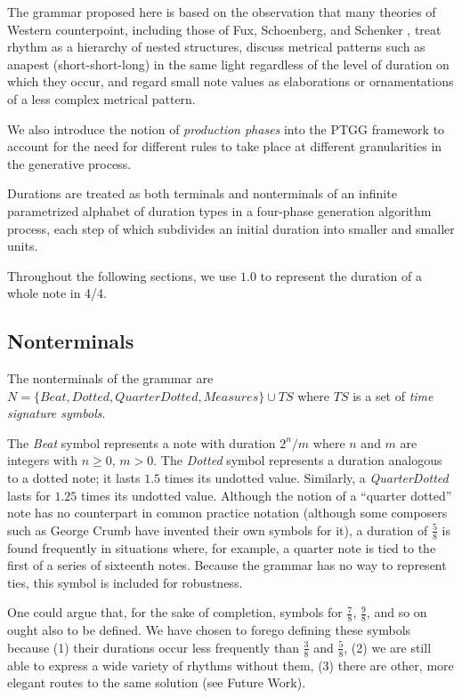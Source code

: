 \documentclass{article}
\begin{document}
The grammar proposed here is based on the observation that many theories of Western counterpoint, including those of Fux, Schoenberg, and Schenker \cite{fux_et_al, schoenberg}, treat rhythm as a hierarchy of nested structures, discuss metrical patterns such as anapest (short-short-long) in the same light regardless of the level of duration on which they occur, and regard small note values as elaborations or ornamentations of a less complex metrical pattern.

We also introduce the notion of \emph{production phases} into the PTGG framework to account for the need for different rules to take place at different granularities in the generative process.

Durations are treated as both terminals and nonterminals of an infinite parametrized alphabet of duration types in a four-phase generation algorithm process, each step of which subdivides an initial duration into smaller and smaller units.

Throughout the following sections, we use $1.0$ to represent the duration of a whole note in 4/4.

\subsection{Nonterminals}

The nonterminals of the grammar are $N=\{Beat,\allowbreak Dotted,\allowbreak QuarterDotted,\allowbreak Measures \} \cup TS$ where $TS$ is a set of \emph{time signature symbols}. 


The \emph{Beat} symbol represents a note with duration $2^n/m$ where $n$ and $m$ are integers with $n \geq 0$, $m > 0$. The \emph{Dotted} symbol represents a duration analogous to a dotted note; it lasts $1.5$ times its undotted value. Similarly, a \emph{QuarterDotted} lasts for $1.25$ times its undotted value. Although the notion of a ``quarter dotted'' note has no counterpart in common practice notation (although some composers such as George Crumb have invented their own symbols for it), a duration of $\frac{5}{8}$ is found frequently in situations where, for example, a quarter note is tied to the first of a series of sixteenth notes. Because the grammar has no way to represent ties, this symbol is included for robustness.

One could argue that, for the sake of completion, symbols for $\frac{7}{8}$, $\frac{9}{8}$, and so on ought also to be defined. We have chosen to forego defining these symbols because (1) their durations occur less frequently than $\frac{3}{8}$ and $\frac{5}{8}$, (2) we are still able to express a wide variety of rhythms without them, (3) there are other, more elegant routes to the same solution (see Future Work).
\end{document}
